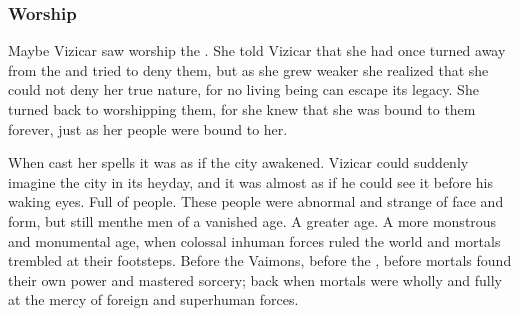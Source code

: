 \subsubsection{Worship}
Maybe Vizicar saw \Lethiarch worship the \SitraAchras. 
She told Vizicar that she had once turned away from the \SitraAchras and tried to deny them, but as she grew weaker she realized that she could not deny her true nature, for no living being can escape its legacy. 
She turned back to worshipping them, for she knew that she was bound to them forever, just as her people were bound to her. 

When \Lethiarch cast her spells it was as if the city awakened.
Vizicar could suddenly imagine the city in its heyday, and it was almost as if he could see it before his waking eyes.
Full of people. 
These people were abnormal and strange of face and form, but still men\dash the men of a vanished age.
A greater age. 
A more monstrous and monumental age, when colossal inhuman forces ruled the world and mortals trembled at their footsteps. 
Before the Vaimons, before the \archons, before mortals found their own power and mastered sorcery; back when mortals were wholly and fully at the mercy of foreign and superhuman forces. 

